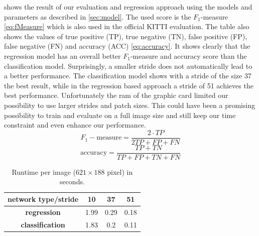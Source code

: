  shows the result of our evaluation and regression
approach using the models and parameters as described in \cref{sec:model}. The
used score is the $F_1$-measure \cref{eq:fMeasure} which is also used in the
official KITTI evaluation. The table also shows the values of true positive
(TP), true negative (TN), false positive (FP), false negative (FN) and accuracy
(ACC) \cref{eq:accuracy}. It shows clearly that the regression model has an
overall better $F_1$-measure and accuracy score than the classification model.
Surprisingly, a smaller stride does not automatically lead to a better
performance. The classification model shows with a stride of the size 37 the
best result, while in the regression based approach a stride of 51 achieves the
best performance. Unfortunately the ram of the graphic card limited our
possibility to use larger strides and patch sizes. This could have been a
promising possibility to train and evaluate on a full image size and still keep
our time constraint and even enhance our performance.\\

\begin{equation} \label{eq:fMeasure}
F_1-\text{measure} = \frac{2 \cdot TP}{2TP +FP +FN}
\end{equation}
\begin{equation} \label{eq:accuracy}
\text{accuracy} = \frac{TP + TN}{TP + FP + TN + FN}
\end{equation}

\begin{table}[]
    \begin{center}
        \begin{tabular}{c|ccc}
            \toprule
            \textbf{network type/stride} & \textbf{10} & \textbf{37} & \textbf{51} \\
            \midrule
            \textbf{regression}     & 1.99 & 0.29 & 0.18 \\
            \textbf{classification} & 1.83 & 0.2  & 0.11\\
            \bottomrule
        \end{tabular}
        \caption{Runtime per image ($621 \times 188$ pixel) in seconds.}
        \label{tab:runtime}
    \end{center}
\end{table}

